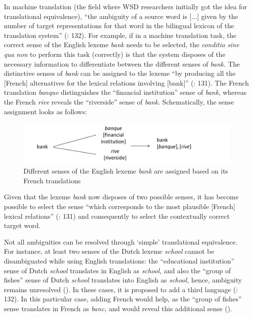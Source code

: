 In machine translation (the field where WSD researchers initially got the idea for translational equivalence), “the ambiguity of a source word is [...] given by the number of target representations for that word in the bilingual lexicon of the translation system” (\citealt{dagan_two_1991}: 132). For example, if in a machine translation task, the correct sense of the English lexeme \textit{bank} needs to be selected, the \textit{conditio} \textit{sine} \textit{qua} \textit{non} to perform this task (correctly) is that the system disposes of the necessary information to differentiate between the different senses of \textit{bank.} The distinctive senses of \textit{bank} can be assigned to the lexeme “by producing all the [French] alternatives for the lexical relations involving [bank]” (\citealt{dagan_two_1991}: 131). The French translation \textit{banque} distinguishes the “financial institution” sense of \textit{bank}, whereas the French \textit{rive} reveals the “riverside” sense of \textit{bank.} Schematically, the sense assignment looks as follows:


\begin{figure}
\includegraphics[height=.3\textheight]{figures/Vandevoorde2-img4.png}
\caption{\label{fig:key:5}  Different senses of the English lexeme \textit{bank} are assigned based on its French translations}
\end{figure}


Given that the lexeme \textit{bank} now disposes of two possible senses, it has become possible to select the sense “which corresponds to the most plausible [French] lexical relations” (\citealt{dagan_two_1991}: 131) and consequently to select the contextually correct target word.



Not all ambiguities can be resolved through ‘simple’ translational equivalence. For instance, at least two senses of the Dutch lexeme \textit{school} cannot be disambiguated while using English translations: the “educational institution” sense of Dutch \textit{school} translates in English as \textit{school,} and also the “group of fishes” sense of Dutch \textit{school} translates into English as \textit{school,} hence, ambiguity remains unresolved (). In these cases, it is proposed to add a third language (\citealt{dagan_two_1991}: 132). In this particular case, adding French would help, as the “group of fishes” sense translates in French as \textit{banc,} and would reveal this additional sense ().


